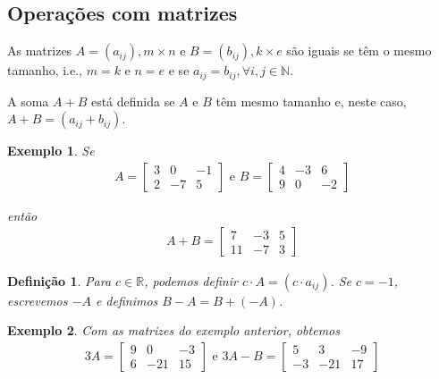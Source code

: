 \documentclass{article}
\newtheorem*{definition}{Definição}
\newtheorem*{example}{Exemplo}
\begin{document}
\subsection{Operações com matrizes}
\par\hspace{12pt} As matrizes $A = (a_{ij}), m\times n$ e $B = (b_{ij}), k\times e$ são iguais se têm o mesmo tamanho, i.e., $m = k$ e $n = e$ e se $a_{ij} = b_{ij}, \forall i,j\in\mathbb{N}$.
\par\vspace{0.3cm} A soma $A+B$ está definida se $A$ e $B$ têm mesmo tamanho e, neste caso, $A+B = (a_{ij}+b_{ij})$.

\begin{example}
	Se
	\begin{align*}
	A = \begin{bmatrix}
	3 & 0 & -1 \\
	2 & -7 & 5
	\end{bmatrix} \text{ e }
	B = \begin{bmatrix}
	4 & -3 & 6 \\ 
	9 & 0 & -2
	\end{bmatrix}
	\end{align*}
	\par\vspace{0.3cm} então
	\begin{align*}
	A+B = \begin{bmatrix}
	7 & -3 & 5  \\ 
	11 & -7 & 3
	\end{bmatrix}
	\end{align*}
\end{example}

\begin{definition}
	Para $c\in\mathbb{R}$, podemos definir $c\cdot A = (c\cdot a_{ij})$. Se $c = -1$, escrevemos $-A$ e definimos $B - A = B + (-A)$.
\end{definition}

\begin{example}
	Com as matrizes do exemplo anterior, obtemos
	\begin{align*}
	3A = \begin{bmatrix}
	9 & 0 & -3 \\ 
	6 & -21 & 15
	\end{bmatrix} \text{ e }
	3A - B = \begin{bmatrix}
	5 & 3 & -9 \\
	-3 & -21 & 17
	\end{bmatrix}
	\end{align*}
\end{example}
\end{document}

